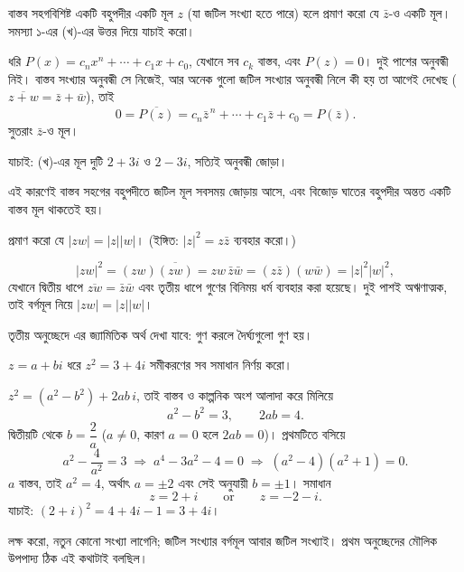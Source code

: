 \documentclass[11pt]{article}
\begin{document}
 বাস্তব সহগবিশিষ্ট একটি বহুপদীর একটি মূল $z$ (যা জটিল সংখ্যা হতে পারে) হলে প্রমাণ করো যে
$\bar{z}$-ও একটি মূল। সমস্যা ১-এর (খ)-এর উত্তর দিয়ে যাচাই করো।

\begin{sol}
ধরি $P(x) = c_{n}x^{n} + \cdots + c_{1}x + c_{0}$, যেখানে সব $c_{k}$ বাস্তব,
এবং $P(z) = 0$। দুই পাশের অনুবন্ধী নিই। বাস্তব সংখ্যার অনুবন্ধী সে নিজেই, আর অনেক গুলো জটিল সংখ্যার অনুবন্ধী নিলে কী হয় তা আগেই দেখেছ ($\overline{z+w} = \bar{z}+\bar{w}$), তাই
\[
  0 = \overline{P(z)} = c_{n}\bar{z}^{\,n} + \cdots + c_{1}\bar{z} + c_{0}
    = P(\bar{z}) .
\]
সুতরাং $\bar{z}$-ও মূল।

যাচাই: (খ)-এর মূল দুটি $2+3i$ ও $2-3i$, সত্যিই অনুবন্ধী জোড়া।

এই কারণেই বাস্তব সহগের বহুপদীতে জটিল মূল সবসময় জোড়ায় আসে, এবং বিজোড় ঘাতের
বহুপদীর অন্তত একটি বাস্তব মূল থাকতেই হয়।
\end{sol}
 প্রমাণ করো যে $|zw| = |z||w|$। (ইঙ্গিত: $|z|^{2} = z\bar{z}$
ব্যবহার করো।)

\begin{sol}
\[
  |zw|^{2} = (zw)\overline{(zw)} = zw\,\bar{z}\bar{w}
           = \left( z\bar{z} \right)\left( w\bar{w} \right)
           = |z|^{2}|w|^{2} ,
\]
যেখানে দ্বিতীয় ধাপে $\overline{zw} = \bar{z}\bar{w}$ এবং তৃতীয় ধাপে গুণের
বিনিময় ধর্ম ব্যবহার করা হয়েছে। দুই পাশই অঋণাত্মক, তাই বর্গমূল নিয়ে
$|zw| = |z||w|$।

তৃতীয় অনুচ্ছেদে এর জ্যামিতিক অর্থ দেখা যাবে: গুণ করলে দৈর্ঘ্যগুলো গুণ হয়।
\end{sol}

 $z = a+bi$ ধরে $z^{2} = 3+4i$ সমীকরণের সব সমাধান নির্ণয় করো।

\begin{sol}
$z^{2} = \left( a^{2}-b^{2} \right) + 2ab\,i$, তাই বাস্তব ও কাল্পনিক অংশ
আলাদা করে মিলিয়ে
\[
  a^{2}-b^{2} = 3, \qquad 2ab = 4 .
\]
দ্বিতীয়টি থেকে $b = \dfrac{2}{a}$ ($a \neq 0$, কারণ $a=0$ হলে $2ab=0$)।
প্রথমটিতে বসিয়ে
\[
  a^{2} - \frac{4}{a^{2}} = 3
  \;\Longrightarrow\; a^{4} - 3a^{2} - 4 = 0
  \;\Longrightarrow\; \left( a^{2}-4 \right)\left( a^{2}+1 \right) = 0 .
\]
$a$ বাস্তব, তাই $a^{2} = 4$, অর্থাৎ $a = \pm 2$ এবং সেই অনুযায়ী
$b = \pm 1$। সমাধান
\[
  z = 2+i \qquad \mathrm{or} \qquad z = -2-i .
\]
যাচাই: $(2+i)^{2} = 4 + 4i - 1 = 3+4i$।

লক্ষ করো, নতুন কোনো সংখ্যা লাগেনি; জটিল সংখ্যার বর্গমূল আবার জটিল সংখ্যাই।
প্রথম অনুচ্ছেদের মৌলিক উপপাদ্য ঠিক এই কথাটাই বলছিল।
\end{sol}
\end{document}
